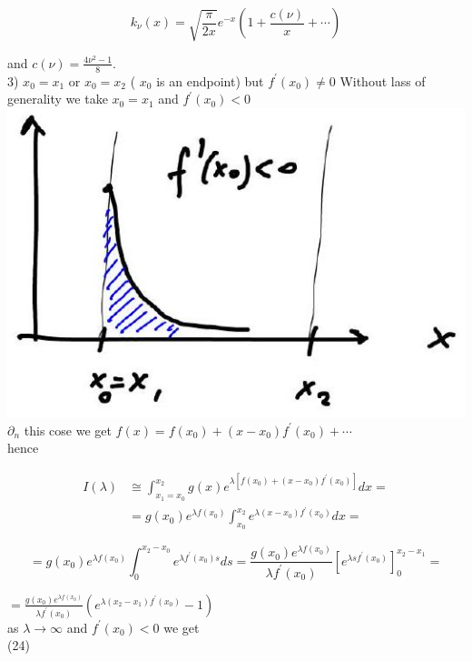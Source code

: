 \documentclass[10pt]{article}
\begin{document}
$$
k_{\nu}(x)=\sqrt{\frac{\pi}{2 x}} e^{-x}\left(1+\frac{c(\nu)}{x}+\cdots\right)
$$

and $c(\nu)=\frac{4 \nu^{2}-1}{8}$.\\
3) $x_{0}=x_{1}$ or $x_{0}=x_{2}$ ( $x_{0}$ is an endpoint) but $f^{\prime}\left(x_{0}\right) \neq 0$ Without lass of generality we take $x_{0}=x_{1}$ and $f^{\prime}\left(x_{0}\right)<0$\\
\includegraphics[max width=\textwidth, center]{2025_10_19_6d9f59a2c3b97d481c52g-4}\\
$\partial_{n}$ this cose we get $f(x)=f\left(x_{0}\right)+\left(x-x_{0}\right) f^{\prime}\left(x_{0}\right)+\cdots$\\
hence

$$
\begin{aligned}
I(\lambda) & \cong \int_{x_{1}=x_{0}}^{x_{2}} g(x) e^{\lambda\left[f\left(x_{0}\right)+\left(x-x_{0}\right) f^{\prime}\left(x_{0}\right)\right]} d x= \\
& =g\left(x_{0}\right) e^{\lambda f\left(x_{0}\right)} \int_{x_{0}}^{x_{2}} e^{\lambda\left(x-x_{0}\right) f^{\prime}\left(x_{0}\right)} d x=
\end{aligned}
$$

$$
=g\left(x_{0}\right) e^{\lambda f\left(x_{0}\right)} \int_{0}^{x_{2}-x_{0}} e^{\lambda f^{\prime}\left(x_{0}\right) s} d s=\frac{g\left(x_{0}\right) e^{\lambda f\left(x_{0}\right)}}{\lambda f^{\prime}\left(x_{0}\right)}\left[e^{\lambda s f^{\prime}\left(x_{0}\right)}\right]_{0}^{x_{2}-x_{1}}=
$$

$=\frac{g\left(x_{0}\right) e^{\lambda f\left(x_{0}\right)}}{\lambda f^{\prime}\left(x_{0}\right)}\left(e^{\lambda\left(x_{2}-x_{1}\right) f^{\prime}\left(x_{0}\right)}-1\right)$\\
as $\lambda \rightarrow \infty$ and $f^{\prime}\left(x_{0}\right)<0$ we get\\
(24)
\end{document}
